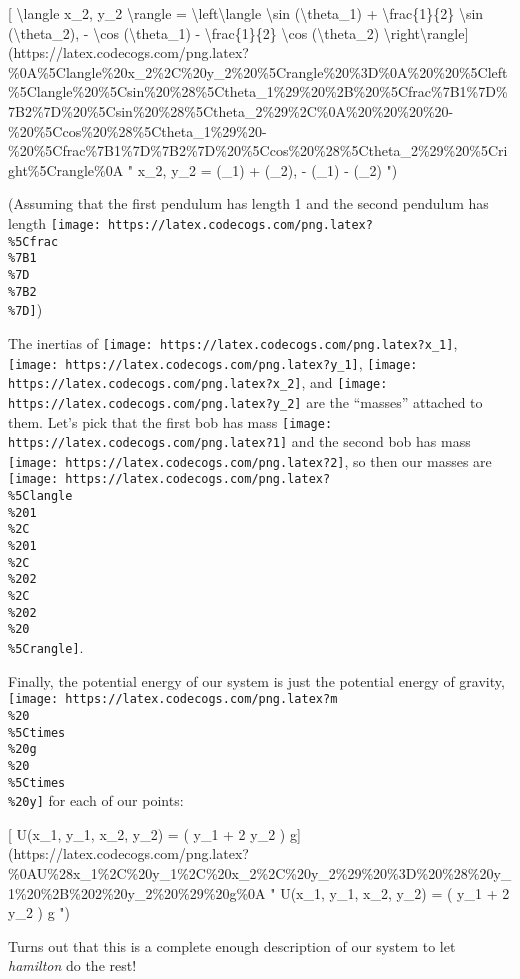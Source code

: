 \documentclass[]{article}
\begin{document}
{[} \textbackslash{}langle x\_2, y\_2 \textbackslash{}rangle =
\textbackslash{}left\textbackslash{}langle \textbackslash{}sin
(\textbackslash{}theta\_1) + \textbackslash{}frac\{1\}\{2\} \textbackslash{}sin
(\textbackslash{}theta\_2), - \textbackslash{}cos (\textbackslash{}theta\_1) -
\textbackslash{}frac\{1\}\{2\} \textbackslash{}cos (\textbackslash{}theta\_2)
\textbackslash{}right\textbackslash{}rangle{]}(https://latex.codecogs.com/png.latex?\%0A\%5Clangle\%20x\_2\%2C\%20y\_2\%20\%5Crangle\%20\%3D\%0A\%20\%20\%5Cleft\%5Clangle\%20\%5Csin\%20\%28\%5Ctheta\_1\%29\%20\%2B\%20\%5Cfrac\%7B1\%7D\%7B2\%7D\%20\%5Csin\%20\%28\%5Ctheta\_2\%29\%2C\%0A\%20\%20\%20\%20-\%20\%5Ccos\%20\%28\%5Ctheta\_1\%29\%20-\%20\%5Cfrac\%7B1\%7D\%7B2\%7D\%20\%5Ccos\%20\%28\%5Ctheta\_2\%29\%20\%5Cright\%5Crangle\%0A
" \langle x\_2, y\_2 \rangle = \left\langle \sin (\theta\_1) + 
\sin (\theta\_2), - \cos (\theta\_1) -  \cos (\theta\_2)
\right\rangle ")

(Assuming that the first pendulum has length 1 and the second pendulum has
length
\texttt{[image: https://latex.codecogs.com/png.latex?\\\%5Cfrac\\\%7B1\\\%7D\\\%7B2\\\%7D]})

The inertias of \texttt{[image: https://latex.codecogs.com/png.latex?x\_1]},
\texttt{[image: https://latex.codecogs.com/png.latex?y\_1]},
\texttt{[image: https://latex.codecogs.com/png.latex?x\_2]}, and
\texttt{[image: https://latex.codecogs.com/png.latex?y\_2]} are the ``masses''
attached to them. Let's pick that the first bob has mass
\texttt{[image: https://latex.codecogs.com/png.latex?1]} and the second bob has
mass \texttt{[image: https://latex.codecogs.com/png.latex?2]}, so then our
masses are
\texttt{[image: https://latex.codecogs.com/png.latex?\\\%5Clangle\\\%201\\\%2C\\\%201\\\%2C\\\%202\\\%2C\\\%202\\\%20\\\%5Crangle]}.

Finally, the potential energy of our system is just the potential energy of
gravity,
\texttt{[image: https://latex.codecogs.com/png.latex?m\\\%20\\\%5Ctimes\\\%20g\\\%20\\\%5Ctimes\\\%20y]}
for each of our points:

{[} U(x\_1, y\_1, x\_2, y\_2) = ( y\_1 + 2 y\_2 )
g{]}(https://latex.codecogs.com/png.latex?\%0AU\%28x\_1\%2C\%20y\_1\%2C\%20x\_2\%2C\%20y\_2\%29\%20\%3D\%20\%28\%20y\_1\%20\%2B\%202\%20y\_2\%20\%29\%20g\%0A
" U(x\_1, y\_1, x\_2, y\_2) = ( y\_1 + 2 y\_2 ) g ")

Turns out that this is a complete enough description of our system to let
\emph{hamilton} do the rest!
\end{document}
